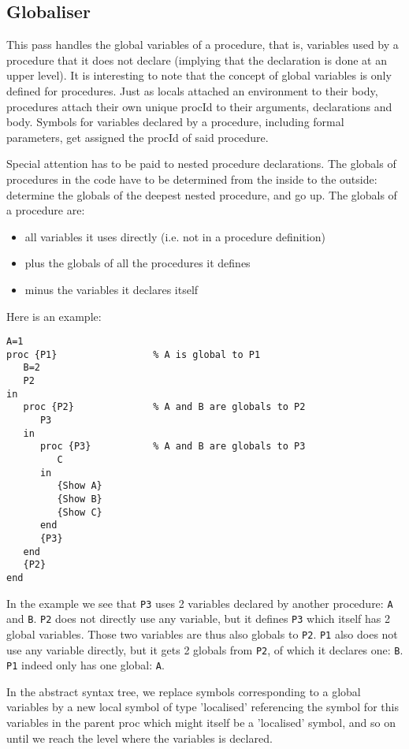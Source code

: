 \documentclass[a4paper]{memoir}
\begin{document}
\subsection{Globaliser}\label{sec:arch:globaliser}            
This pass handles the global variables of a procedure, that is, variables used by a procedure that it does not declare (implying that the declaration is done at an upper level). It is interesting to note that the concept of global variables is only defined for procedures.
Just as locals attached an environment to their body, procedures attach their own unique procId to their arguments, declarations and body.
Symbols for variables declared by a procedure, including formal parameters, get assigned the procId of said procedure.

Special attention has to be paid to nested procedure declarations.
The globals of procedures in the code have to be determined from the inside to the outside: determine the globals of the deepest nested procedure, and go up. 
The globals of a procedure are:
\begin{itemize}
  \item all variables it uses directly (i.e. not in a procedure definition)
  \item plus the globals of all the procedures it defines
  \item minus the variables it declares itself
\end{itemize}

Here is an example:
\begin{lstlisting}
A=1
proc {P1}                 % A is global to P1
   B=2
   P2
in
   proc {P2}              % A and B are globals to P2
      P3 
   in
      proc {P3}           % A and B are globals to P3
         C
      in
         {Show A}
         {Show B}
         {Show C}
      end
      {P3}
   end
   {P2}
end
\end{lstlisting}


In the example we see that \lstinline!P3! uses 2 variables declared by another procedure: \lstinline!A! and \lstinline!B!. 
\lstinline!P2! does not directly use any variable, but it defines \lstinline!P3! which itself has 2 global variables. Those two variables are thus also globals to \lstinline!P2!.
\lstinline!P1! also does not use any variable directly, but it gets 2 globals from \lstinline!P2!, of which it declares one: \lstinline!B!. \lstinline!P1! indeed only has one global: \lstinline!A!.

In the abstract syntax tree, we replace symbols corresponding to a global variables by a new local symbol of type 'localised' referencing the symbol for this variables in the parent proc which might itself be a 'localised' symbol, and so on until we reach the level where the variables is declared.
\end{document}
